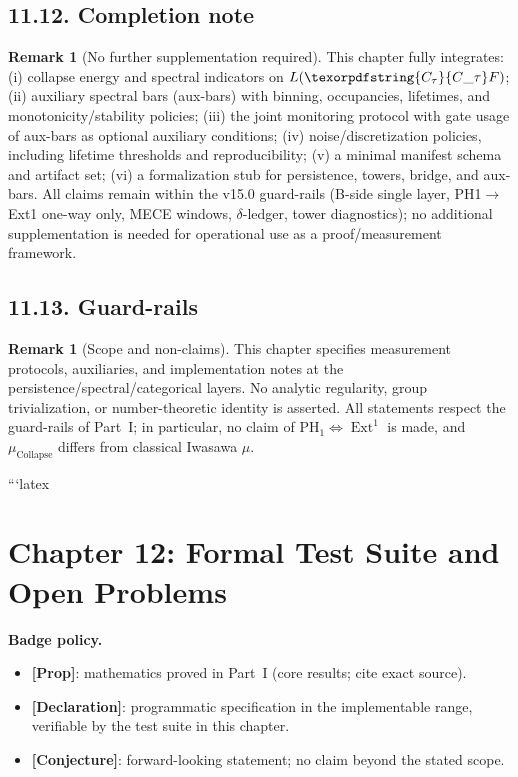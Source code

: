 \documentclass[11pt]{article}
\DeclareMathOperator{\Ext}{Ext}
\numberwithin{equation}{section}
\theoremstyle{definition}
\newtheorem{remark}[theorem]{Remark}
\DeclareRobustCommand{\Ctau}{\texorpdfstring{\ensuremath{C_{\tau}}}{C\_\tau}}
\DeclareRobustCommand{\muc}{\mu_{\mathrm{Collapse}}}
\begin{document}
\subsection*{11.12. Completion note}
\begin{remark}[No further supplementation required]
This chapter fully integrates: (i) collapse energy and spectral indicators on $L(\Ctau F)$; (ii) auxiliary spectral bars (aux-bars) with binning, occupancies, lifetimes, and monotonicity/stability policies; (iii) the joint monitoring protocol with gate usage of aux-bars as optional auxiliary conditions; (iv) noise/discretization policies, including lifetime thresholds and reproducibility; (v) a minimal manifest schema and artifact set; (vi) a formalization stub for persistence, towers, bridge, and aux-bars. All claims remain within the v15.0 guard-rails (B-side single layer, PH1$\to$Ext1 one-way only, MECE windows, $\delta$-ledger, tower diagnostics); no additional supplementation is needed for operational use as a proof/measurement framework.
\end{remark}

\subsection*{11.13. Guard-rails}
\begin{remark}[Scope and non-claims]\label{rk:11-guard}
This chapter specifies measurement protocols, auxiliaries, and implementation notes at the persistence/spectral/categorical layers. No analytic regularity, group trivialization, or number-theoretic identity is asserted. All statements respect the guard-rails of Part~I; in particular, no claim of $\mathrm{PH}_1\Leftrightarrow \Ext^1$ is made, and $\muc$ differs from classical Iwasawa $\mu$.
\end{remark}



```latex
\section{Chapter 12: Formal Test Suite and Open Problems}

\noindent\textbf{Badge policy.}
\begin{itemize}
  \item \textbf{[Prop]}: mathematics proved in Part~I (core results; cite exact source).
  \item \textbf{[Declaration]}: programmatic specification in the implementable range, verifiable by the test suite in this chapter.
  \item \textbf{[Conjecture]}: forward-looking statement; no claim beyond the stated scope.
\end{itemize}
\end{document}
